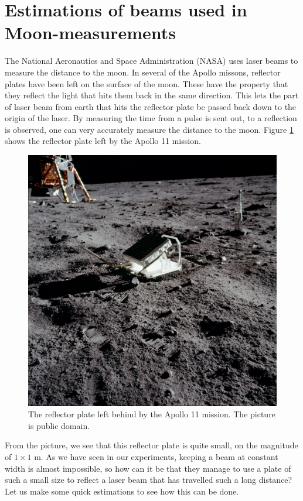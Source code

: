 \documentclass[a4paper, 11pt, notitlepage, english]{article}
\begin{document}
\clearpage

\section{Estimations of beams used in Moon-measurements}

The National Aeronautics and Space Administration (NASA) uses laser beams to measure the distance to the moon. In several of the Apollo missons, reflector plates have been left on the surface of the moon. These have the property that they reflect the light that hits them back in the same direction. This lets the part of laser beam from earth that hits the reflector plate be passed back down to the origin of the laser. By measuring the time from a pulse is sent out, to a reflection is observed, one can very accurately measure the distance to the moon. Figure \ref{fig:reflector} shows the reflector plate left by the Apollo 11 mission.

\begin{figure}[hptb]
\centering
\includegraphics[width=\textwidth]{Apollo_11_Lunar_Laser_Ranging_Experiment}  
\caption{The reflector plate left behind by the Apollo 11 mission. The picture is public domain. \label{fig:reflector}}
\end{figure}

From the picture, we see that this reflector plate is quite small, on the magnitude of $1\times1$ m. As we have seen in our experiments, keeping a beam at constant width is almost impossible, so how can it be that they manage to use a plate of such a small size to reflect a laser beam that has travelled such a long distance? Let us make some quick estimations to see how this can be done.
\end{document}
